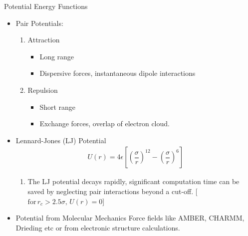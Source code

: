 \documentclass[slidestop,mathserif,compress,xcolor=svgnames]{beamer}
\newenvironment{bblock}[0]
{
\begin{beamerboxesrounded}[upper=uppercol1,lower=lowercol1,shadow=true]}
{\end{beamerboxesrounded}}
\begin{document}
\begin{frame}
  \begin{bblock}{Potential Energy Functions}
    \begin{itemize}
    \item Pair Potentials:
      \begin{enumerate}
      \item Attraction
        \begin{itemize}
        \item Long range
        \item Dispersive forces, instantaneous dipole interactions
        \end{itemize}
      \item Repulsion
        \begin{itemize}
        \item Short range
        \item Exchange forces, overlap of electron cloud.
        \end{itemize}
      \end{enumerate}
    \item Lennard-Jones (LJ) Potential
      \begin{align*}
        U(r) = 4\epsilon\left[\left(\dfrac{\sigma}{r}\right)^{12} - \left(\dfrac{\sigma}{r}\right)^6\right]
      \end{align*}
      \begin{enumerate}
      \item The LJ potential decays rapidly, significant computation time can be saved by
        neglecting pair interactions beyond a cut-off. [$\mathrm{for}\, r_c > 2.5\sigma,\,U(r)=0$]
      \end{enumerate}
    \item Potential from Molecular Mechanics Force fields like AMBER, CHARMM, Drieding etc or from electronic structure calculations.
    \end{itemize}
  \end{bblock}
\end{frame}
\end{document}
